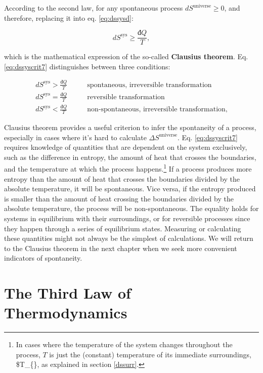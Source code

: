\documentclass[
]{book}
\theoremstyle{definition}
\theoremstyle{definition}
\theoremstyle{definition}
\theoremstyle{remark}
\begin{document}
According to the second law, for any spontaneous process \(d S^{\mathrm{universe}}\geq0\), and therefore, replacing it into eq. \eqref{eq:dssysd}:

\begin{equation}
d S^{\mathrm{sys}} \geq \frac{đQ}{T},
\label{eq:dssyscrit7}
\end{equation}

which is the mathematical expression of the so-called \textbf{Clausius theorem}. Eq. \eqref{eq:dssyscrit7} distinguishes between three conditions:

\begin{equation}
\begin{aligned}
d S^{\mathrm{sys}} > \frac{đQ}{T} \qquad &\text{spontaneous, irreversible transformation} \\
d S^{\mathrm{sys}} = \frac{đQ}{T} \qquad &\text{reversible transformation} \\
d S^{\mathrm{sys}} < \frac{đQ}{T} \qquad &\text{non-spontaneous, irreversible transformation}, 
\end{aligned}
\label{eq:dssyscond}
\end{equation}

Clausius theorem provides a useful criterion to infer the spontaneity of a process, especially in cases where it's hard to calculate \(\Delta S^{\mathrm{universe}}\). Eq. \eqref{eq:dssyscrit7} requires knowledge of quantities that are dependent on the system exclusively, such as the difference in entropy, the amount of heat that crosses the boundaries, and the temperature at which the process happens.\footnote{In cases where the temperature of the system changes throughout the process, \(T\) is just the (constant) temperature of its immediate surroundings, \$T\_\{\}, as explained in section \ref{dssurr}.} If a process produces more entropy than the amount of heat that crosses the boundaries divided by the absolute temperature, it will be spontaneous. Vice versa, if the entropy produced is smaller than the amount of heat crossing the boundaries divided by the absolute temperature, the process will be non-spontaneous. The equality holds for systems in equilibrium with their surroundings, or for reversible processes since they happen through a series of equilibrium states. Measuring or calculating these quantities might not always be the simplest of calculations. We will return to the Clausius theorem in the next chapter when we seek more convenient indicators of spontaneity.

\hypertarget{thirdlawsect}{%
\section{The Third Law of Thermodynamics}\label{thirdlawsect}}
\end{document}
